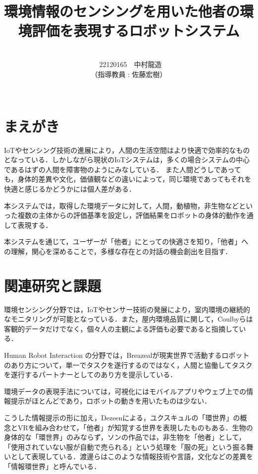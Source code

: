 \documentclass[paper=a4paper,jafontsize=9pt,head_space=15mm,gutter=20mm,
twocolumn,number_of_lines=49, line_length=26zw]{myuarticle}
\begin{document}
\title{{\LARGE\bfseries\gtfamily 環境情報のセンシングを用いた他者の環境評価を表現するロボットシステム}}
\author{\\\ 22120165　中村龍造 \\ （指導教員 : 佐藤宏樹）\\ \\}
\date{}
\maketitle

\section{まえがき}
IoTやセンシング技術の進展により，人間の生活空間はより快適で効率的なものとなっている．しかしながら現状のIoTシステムは，多くの場合システムの中心であるはずの人間を障害物のようにみなしている\cite{Petrov-2018-WhenIoTKeepsPeople}．
また人間どうしであっても，身体的差異や文化，価値観などの違いによって，同じ環境であってもそれを快適と感じるかどうかには個人差がある．

本システムでは，取得した環境データに対して，人間，動植物，非生物などといった複数の主体からの評価基準を設定し，評価結果をロボットの身体的動作を通して表現する．

本システムを通じて，ユーザーが「他者」にとっての快適さを知り，「他者」への理解，関心を深めることで，多様な存在との対話の機会創出を目指す．

\section{関連研究と課題}
環境センシング分野では，IoTやセンサー技術の発展により，室内環境の継続的なモニタリングが可能となっている\cite{Saini-2020-IndoorAirQualityMonitoring}．また，屋内環境品質に関して，Coulbyら\cite{Coulby-2020-ScopingReviewTechnologicalApproaches}は客観的データだけでなく，個々人の主観による評価も必要であると指摘している．

Human Robot
Interaction
の分野では，Breazeal\cite{C.Breazeal-2004-SocialInteractionsHRIRobot}が現実世界で活動するロボットのあり方について，単一でタスクを遂行するのではなく，人間と協働してタスクを遂行するパートナーとしてのあり方を提示している．

環境データの表現手法については，可視化にはモバイルアプリやウェブ上での情報提示がほとんどであり\cite{Saini-2020-IndoorAirQualityMonitoring}，ロボットの動きを用いたものは少ない．

こうした情報提示の形に加え，Dezeen\cite{-2015-VirtualRealityPresentsForest}による，ユクスキュルの「環世界」の概念とVRを組み合わせて，「他者」が知覚する世界を表現したものもある．生物の身体的な「環世界」のみならず，ソン\cite{--ソンヨン}の作品では，非生物を「他者」として，「使用されていない服が自動で売られる」という処理を「服の死」という振る舞いとして表現している．渡邊ら\cite{渡邉-2019-情報環世}はこのような情報技術や言語，文化などの差異を「情報環世界」と呼んでいる．
\end{document}
